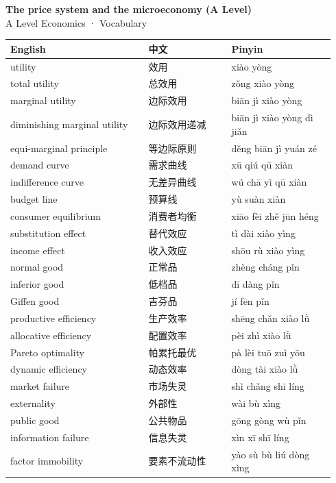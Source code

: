 \documentclass[11pt]{article}
\begin{document}
\begin{center}
  {\LARGE\bfseries The price system and the microeconomy (A Level)}\\[0.35em]
  {\large A Level Economics · Vocabulary}
\end{center}
\vspace{0.6em}

\begin{longtable}{@{}p{0.40\linewidth}p{0.24\linewidth}p{0.30\linewidth}@{}}
\toprule
\textbf{English} & \textbf{中文} & \textbf{Pinyin} \\
\midrule
\endhead
\bottomrule
\endlastfoot
utility & 效用 & xiào yòng \\
total utility & 总效用 & zǒng xiào yòng \\
marginal utility & 边际效用 & biān jì xiào yòng \\
diminishing marginal utility & 边际效用递减 & biān jì xiào yòng dì jiǎn \\
equi-marginal principle & 等边际原则 & děng biān jì yuán zé \\
demand curve & 需求曲线 & xū qiú qū xiàn \\
indifference curve & 无差异曲线 & wú chā yì qū xiàn \\
budget line & 预算线 & yù suàn xiàn \\
consumer equilibrium & 消费者均衡 & xiāo fèi zhě jūn héng \\
substitution effect & 替代效应 & tì dài xiào yìng \\
income effect & 收入效应 & shōu rù xiào yìng \\
normal good & 正常品 & zhèng cháng pǐn \\
inferior good & 低档品 & dī dàng pǐn \\
Giffen good & 吉芬品 & jí fēn pǐn \\
productive efficiency & 生产效率 & shēng chǎn xiào lǜ \\
allocative efficiency & 配置效率 & pèi zhì xiào lǜ \\
Pareto optimality & 帕累托最优 & pà lèi tuō zuì yōu \\
dynamic efficiency & 动态效率 & dòng tài xiào lǜ \\
market failure & 市场失灵 & shì chǎng shī líng \\
externality & 外部性 & wài bù xìng \\
public good & 公共物品 & gōng gòng wù pǐn \\
information failure & 信息失灵 & xìn xī shī líng \\
factor immobility & 要素不流动性 & yào sù bù liú dòng xìng \\

\end{longtable}
\end{document}
